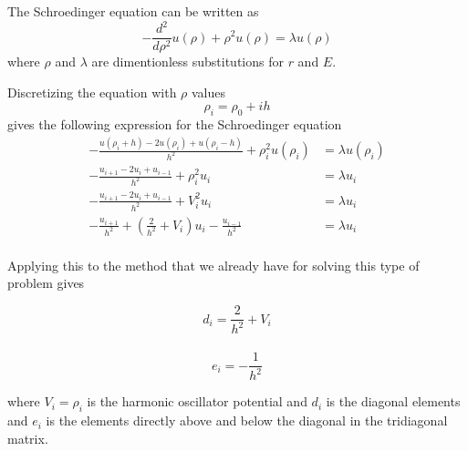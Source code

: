 \documentclass{article}
\begin{document}
The Schroedinger equation can be written as
$$-\frac{d^2}{d\rho^2}u(\rho)+\rho^2u(\rho)=\lambda u(\rho)$$
where $\rho$ and $\lambda$ are dimentionless substitutions for $r$ and $E$.

Discretizing the equation with $\rho$ values
$$\rho_i=\rho_0+ih$$
gives the following expression for the Schroedinger equation
\begin{equation*}
\begin{split}
-\frac{u(\rho_i+h)-2u(\rho_i)+u(\rho_i-h)}{h^2}+\rho_i^2u(\rho_i)&=\lambda u(\rho_i)\\
-\frac{u_{i+1}-2u_i+u_{i-1}}{h^2}+\rho_i^2u_i&=\lambda u_i\\
-\frac{u_{i+1}-2u_i+u_{i-1}}{h^2}+V_i^2u_i&=\lambda u_i\\
-\frac{u_{i+1}}{h^2}+(\tfrac{2}{h^2}+V_i)u_i-\frac{u_{i-1}}{h^2}&=\lambda u_i\\
\end{split}
\end{equation*}


Applying this to the method that we already have for solving this type of problem gives

$$d_i=\frac{2}{h^2}+V_i$$\\
$$e_i=-\frac{1}{h^2}$$

where $V_i=\rho_i$ is the harmonic oscillator potential and $d_i$ is the diagonal elements and $e_i$ is the elements directly above and below the diagonal in the tridiagonal matrix.
\end{document}
